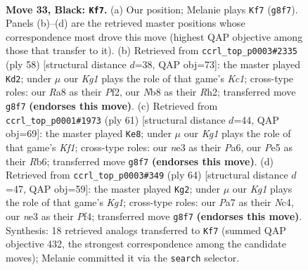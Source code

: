 \documentclass[11pt]{article}
\begin{document}
\clearpage

\begin{figure}[p]\centering
\begin{subfigure}{0.46\textwidth}\centering
\resizebox{\linewidth}{!}{%
\newchessgame
\chessboard[
  setfen={rnR3k1/p5pp/5p2/1P2p2P/P7/4Nb2/8/R1K5 b - - 5 33},
  showmover=false,
  pgfstyle=straightmove, color=movearrow, markmove={g8-f7}
]}
\caption{}
\end{subfigure}\hfill
\begin{subfigure}{0.46\textwidth}\centering
\resizebox{\linewidth}{!}{%
\newchessgame
\chessboard[
  setfen={3r3k/5p1n/4p2B/1p2P3/3pN3/P7/1PP2P1R/2K3r1 w - - 2 30},
  showmover=false,
  pgfstyle=straightmove, color=movearrow, markmove={c1-d2}
]}
\caption{}
\end{subfigure}
\\[4pt]
\begin{subfigure}{0.46\textwidth}\centering
\resizebox{\linewidth}{!}{%
\newchessgame
\chessboard[
  setfen={5k2/1p4pp/pr6/1b4P1/3P1R1P/2N5/1P3K2/8 b - - 1 31},
  showmover=false,
  pgfstyle=straightmove, color=movearrow, markmove={f8-e8}
]}
\caption{}
\end{subfigure}\hfill
\begin{subfigure}{0.46\textwidth}\centering
\resizebox{\linewidth}{!}{%
\newchessgame
\chessboard[
  setfen={3r2k1/5p2/R3p1pp/2Rn4/2N2P2/6P1/5P1P/1r4K1 w - - 1 33},
  showmover=false,
  pgfstyle=straightmove, color=movearrow, markmove={g1-g2}
]}
\caption{}
\end{subfigure}
\caption{\textbf{Move 33, Black: \texttt{Kf7}.} (a) Our position; Melanie plays \texttt{Kf7} (\texttt{g8f7}). Panels (b)--(d) are the retrieved master positions whose correspondence most drove this move (highest QAP objective among those that transfer to it). (b) Retrieved from \texttt{ccrl\_top\_p0003\#2335} (ply 58) [structural distance $d$=38, QAP obj=73]: the master played \texttt{Kd2}; under $\mu$ our \emph{Kg1} plays the role of that game's \emph{Kc1}; cross-type roles: our \emph{R}a8 as their \emph{P}f2, our \emph{N}b8 as their \emph{R}h2; transferred move \texttt{g8f7} \textbf{(endorses this move)}. (c) Retrieved from \texttt{ccrl\_top\_p0001\#1973} (ply 61) [structural distance $d$=44, QAP obj=69]: the master played \texttt{Ke8}; under $\mu$ our \emph{Kg1} plays the role of that game's \emph{Kf1}; cross-type roles: our \emph{n}e3 as their \emph{P}a6, our \emph{P}e5 as their \emph{R}b6; transferred move \texttt{g8f7} \textbf{(endorses this move)}. (d) Retrieved from \texttt{ccrl\_top\_p0003\#349} (ply 64) [structural distance $d$=47, QAP obj=59]: the master played \texttt{Kg2}; under $\mu$ our \emph{Kg1} plays the role of that game's \emph{Kg1}; cross-type roles: our \emph{P}a7 as their \emph{N}c4, our \emph{n}e3 as their \emph{P}f4; transferred move \texttt{g8f7} \textbf{(endorses this move)}. Synthesis: 18 retrieved analogs transferred to \texttt{Kf7} (summed QAP objective 432, the strongest correspondence among the candidate moves); Melanie committed it via the \texttt{search} selector.}
\label{fig:thought-m65}
\end{figure}
\end{document}
